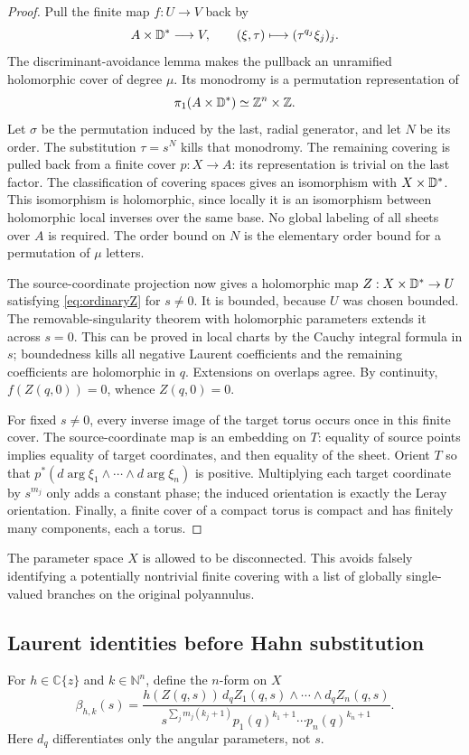 \documentclass[11pt,letterpaper]{article}
\theoremstyle{definition}
\theoremstyle{remark}
\newcommand{\C}{\mathbb C}\newcommand{\R}{\mathbb R}
\newcommand{\N}{\mathbb N}\newcommand{\Z}{\mathbb Z}\newcommand{\Q}{\mathbb Q}
\numberwithin{equation}{section}
\begin{document}
\begin{proof}
Pull the finite map $f:U\to V$ back by
\[
 A\times\mathbb D^*\longrightarrow V,\qquad
 (\xi,\tau)\longmapsto(\tau^{q_j}\xi_j)_j.
\]
The discriminant-avoidance lemma makes the pullback an unramified holomorphic
cover of degree $\mu$. Its monodromy is a permutation representation of
\[
 \pi_1(A\times\D^*)\simeq\Z^n\times\Z.
\]
Let $\sigma$ be the permutation induced by the last, radial generator, and
let $N$ be its order. The substitution $\tau=s^N$ kills that monodromy.
The remaining covering is pulled back from a finite cover $p:X\to A$:
its representation is trivial on the last factor. The classification of
covering spaces gives an isomorphism with $X\times\mathbb D^*$. This isomorphism is
holomorphic, since locally it is an isomorphism between holomorphic local
inverses over the same base. No global labeling of all sheets over $A$ is
required. The order bound on $N$ is the elementary order bound for a
permutation of $\mu$ letters.

The source-coordinate projection now gives a holomorphic map
$Z:X\times\mathbb D^*\to U$ satisfying \eqref{eq:ordinaryZ} for $s\ne0$.
It is bounded, because $U$ was chosen bounded. The removable-singularity
theorem with holomorphic parameters extends it across $s=0$. This can be
proved in local charts by the Cauchy integral formula in $s$; boundedness kills
all negative Laurent coefficients and the remaining coefficients are
holomorphic in $q$. Extensions on overlaps agree. By continuity,
$f(Z(q,0))=0$, whence $Z(q,0)=0$.

For fixed $s\ne0$, every inverse image of the target torus occurs once in
this finite cover. The source-coordinate map is an embedding on $T$: equality
of source points implies equality of target coordinates, and then equality
of the sheet. Orient $T$ so that
$p^*(d\arg\xi_1\wedge\cdots\wedge d\arg\xi_n)$ is positive. Multiplying
each target coordinate by $s^{m_j}$ only adds a constant phase; the induced
orientation is exactly the Leray orientation. Finally, a finite cover of a
compact torus is compact and has finitely many components, each a torus.
\end{proof}

The parameter space $X$ is allowed to be disconnected. This avoids falsely
identifying a potentially nontrivial finite covering with a list of globally
single-valued branches on the original polyannulus.

\subsection{Laurent identities before Hahn substitution}
For $h\in\C\{z\}$ and $k\in\N^n$, define the $n$-form on $X$
\begin{equation}\label{eq:ordinaryform}
 \beta_{h,k}(s)=
 \frac{h(Z(q,s))\,d_qZ_1(q,s)\wedge\cdots\wedge d_qZ_n(q,s)}
 {s^{\sum_jm_j(k_j+1)}p_1(q)^{k_1+1}\cdots p_n(q)^{k_n+1}}.
\end{equation}
Here $d_q$ differentiates only the angular parameters, not $s$.
\end{document}
